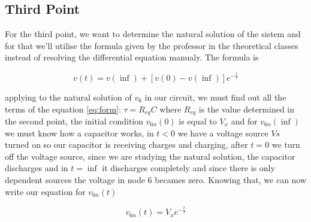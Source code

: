 \vspace{5mm}
\begin{table}[H]
\centering
\begin{tabularx}{0.6\textwidth} {
  | >{\raggedright\arraybackslash}X
  | >{\raggedleft\arraybackslash}X | }
 \hline

\end{tabularx}
\end{table}
\vspace{5mm}

\vspace{5mm}
\begin{table}[H]
\centering
\begin{tabularx}{0.6\textwidth} {
  | >{\raggedright\arraybackslash}X
  | >{\raggedleft\arraybackslash}X | }
 \hline

\end{tabularx}
\end{table}
\vspace{5mm}

\subsection{Third Point}
\label{ssec:3T}

\noindent \par For the third point, we want to determine the natural solution of the sistem and for that we'll utilise the formula given by the professor in the theoretical classes instead of resolving the differential equation manualy. The formula is 

\begin{equation}
  v(t) = v(\inf) + [v(0) - v(\inf)]e^{-\frac{t}{\tau}}
  \label{eq:form}
\end{equation}

applying to the natural solution of $v_6$ in our circuit, we must find out all the terms of the equation \ref{eq:form}: $\tau=R_{eq}C$ where $R_{eq}$ is the value determined in the second point, the initial condition $v_{6n}(0)$ is equal to $V_x$ and for $v_{6n}(\inf)$ we must know how a capacitor works, in $t<0$ we have a voltage source $Vs$ turned on so our capacitor is receiving charges and charging, after $t=0$ we turn off the voltage source, since we are studying the natural solution, the capacitor discharges and in $t=\inf$ it discharges completely and since there is only dependent sources the voltage in node 6 becames zero. Knowing that, we can now write our equation for $v_{6n}(t)$

\begin{equation}
  v_{6n}(t) = V_x e^{-\frac{t}{\tau}}
  \label{eq:snat}
\end{equation}

